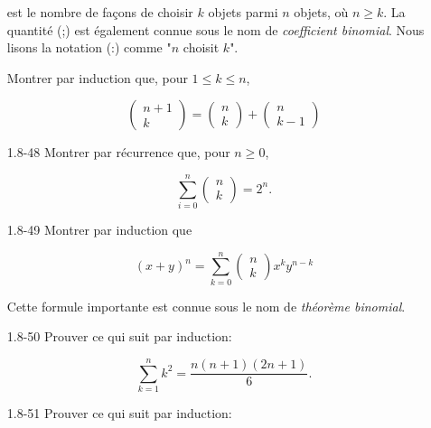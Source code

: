 \documentclass[10pt,twoside,a4paper]{book}
\begin{document}
\begin{enumerate}
  \noindent
  est le nombre de façons de choisir $k$ objets parmi $n$ objets, où $n \geq k$. La quantité (;) est également connue sous le nom de \textit{coefficient binomial}. Nous lisons la notation (:) comme "$n$ choisit $k$".
  
  \noindent
  Montrer par induction que, pour $1 \leq k \leq n$,

  \begin{equation}
    \begin{pmatrix}
      n+1 \\
      k 
    \end{pmatrix} =
    \begin{pmatrix}
      n \\
      k 
    \end{pmatrix} +
    \begin{pmatrix}
      n \\
      k-1 
    \end{pmatrix}
  \end{equation}
  \item[1.8-48] Montrer par récurrence que, pour $n \geq 0$,
  
  \begin{equation*}
    \sum_{i=0}^{n} \begin{pmatrix}
      n \\
      k 
    \end{pmatrix} =2^n.
  \end{equation*}
  \item[1.8-49] Montrer par induction que
  
  \begin{equation}
    (x+y)^n = \sum_{k=0}^{n} \begin{pmatrix}
      n \\
      k 
    \end{pmatrix} x^k y^{n-k}
  \end{equation}

  \noindent
  Cette formule importante est connue sous le nom de \textit{théorème binomial}.


  \item[1.8-50] Prouver ce qui suit par induction:
  
  \begin{equation*}
    \sum_{k=1}^{n}k^2 = \frac{n(n+1)(2n+1)}{6}.
  \end{equation*}
  \item[1.8-51] Prouver ce qui suit par induction:
  

\end{enumerate}
\end{document}
